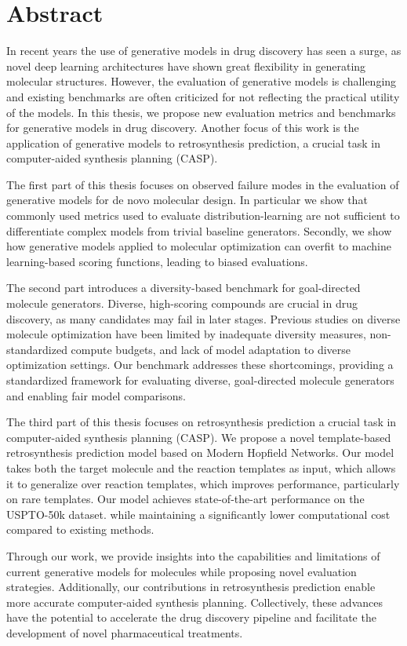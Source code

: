 
{%
\chapter*{Abstract}
In recent years the use of generative models in drug discovery has seen a surge, as novel deep
learning architectures have shown great flexibility in generating molecular structures. However, the
evaluation of generative models is challenging and existing benchmarks are often criticized 
for not reflecting the practical utility of the models. In this thesis, we propose new
evaluation metrics and benchmarks for generative models in drug discovery. Another focus of this
work is the application of generative models to retrosynthesis prediction, a crucial task in
computer-aided synthesis planning (CASP). 

The first part of this thesis focuses on observed failure modes in the evaluation of generative
models for de novo molecular design. In particular we show that commonly used metrics used to
evaluate distribution-learning are not sufficient to differentiate complex models from trivial
baseline generators. Secondly, we show how generative models applied to molecular optimization can
overfit to machine learning-based scoring functions, leading to biased evaluations. 

The second part introduces a diversity-based benchmark for goal-directed molecule generators.
Diverse, high-scoring compounds are crucial in drug discovery, as many candidates may fail in later
stages. Previous studies on diverse molecule optimization have been limited by inadequate diversity
measures, non-standardized compute budgets, and lack of model adaptation to diverse optimization settings.
Our benchmark addresses these shortcomings, providing a standardized framework for evaluating
diverse, goal-directed molecule generators and enabling fair model comparisons.

The third part of this thesis focuses on retrosynthesis prediction a crucial task in computer-aided
synthesis planning (CASP). We propose a novel template-based retrosynthesis prediction model based
on Modern Hopfield Networks. Our model takes both the target molecule and the reaction templates 
as input, which allows it to generalize over reaction templates, which improves 
performance, particularly on rare templates. Our model achieves state-of-the-art performance on the USPTO-50k dataset.
while maintaining a significantly lower computational cost compared to existing methods. 

Through our work, we provide insights into the capabilities and limitations of
current generative models for molecules while proposing novel evaluation
strategies. Additionally, our contributions in retrosynthesis prediction enable
more accurate computer-aided synthesis planning. Collectively, these advances
have the potential to accelerate the drug discovery pipeline and facilitate the
development of novel pharmaceutical treatments.
}